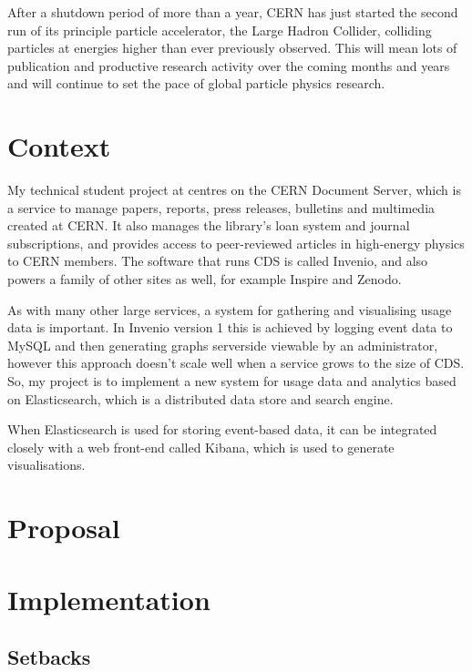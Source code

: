 \documentclass[a4paper,11pt]{article} %
\begin{document}

After a shutdown period of more than a year, CERN has just started the second
run of its principle particle accelerator, the Large Hadron Collider, colliding
particles at energies higher than ever previously observed.  This will mean
lots of publication and productive research activity over the coming months and
years and will continue to set the pace of global particle physics research.

\section{Context}
\label{sec:context}
My technical student project at centres on the CERN Document Server, which is a
service to manage papers, reports, press releases, bulletins and multimedia
created at CERN.  It also manages the library's loan system and journal
subscriptions, and provides access to peer-reviewed articles in high-energy
physics to CERN members.  The software that runs CDS is called Invenio, and
also powers a family of other sites as well, for example Inspire and Zenodo.

As with many other large services, a system for gathering and visualising usage
data is important.  In Invenio version 1 this is achieved by logging event data
to MySQL and then generating graphs serverside viewable by an administrator,
however this approach doesn't scale well when a service grows to the size of
CDS.  So, my project is to implement a new system for usage data and analytics
based on Elasticsearch, which is a distributed data store and search engine.

When Elasticsearch is used for storing event-based data, it can be integrated
closely with a web front-end called Kibana, which is used to generate
visualisations.

\section{Proposal}
\label{sec:proposal}

\section{Implementation}
\label{sec:implementation}

\subsection{Setbacks}
\label{sec:setbacks}
\end{document}

